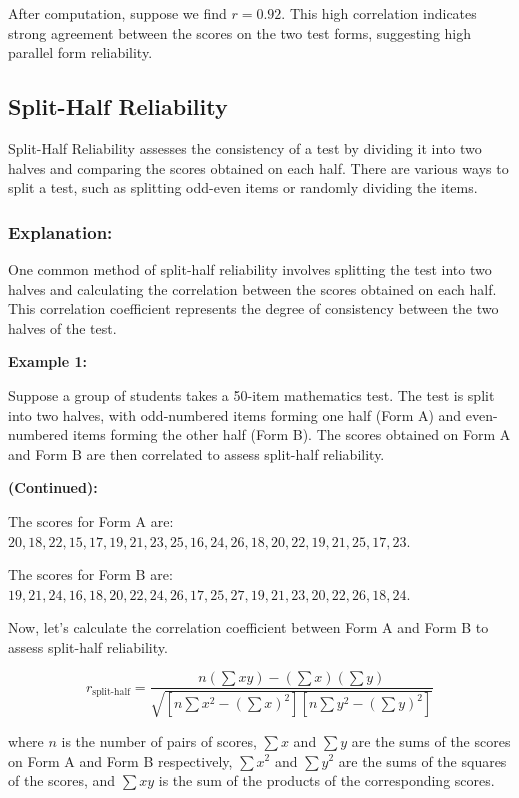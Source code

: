 \documentclass[12pt, a4paper]{exam}
\begin{document}
After computation, suppose we find \(r = 0.92\). This high correlation indicates strong agreement between the scores on the two test forms, suggesting high parallel form reliability.

\subsection{Split-Half Reliability}

Split-Half Reliability assesses the consistency of a test by dividing it into two halves and comparing the scores obtained on each half. There are various ways to split a test, such as splitting odd-even items or randomly dividing the items.

\subsubsection{Explanation:}

One common method of split-half reliability involves splitting the test into two halves and calculating the correlation between the scores obtained on each half. This correlation coefficient represents the degree of consistency between the two halves of the test. 

\textbf{Example 1:}

Suppose a group of students takes a 50-item mathematics test. The test is split into two halves, with odd-numbered items forming one half (Form A) and even-numbered items forming the other half (Form B). The scores obtained on Form A and Form B are then correlated to assess split-half reliability.

\textbf{ (Continued):}

The scores for Form A are: $20, 18, 22, 15, 17, 19, 21, 23, 25, 16, 24, 26, 18, 20, 22, 19, 21, 25, 17, 23$.

The scores for Form B are: $19, 21, 24, 16, 18, 20, 22, 24, 26, 17, 25, 27, 19, 21, 23, 20, 22, 26, 18, 24$.

Now, let's calculate the correlation coefficient between Form A and Form B to assess split-half reliability.

\[
r_{\text{split-half}} = \frac{n(\sum xy) - (\sum x)(\sum y)}{\sqrt{[n\sum x^2 - (\sum x)^2][n\sum y^2 - (\sum y)^2]}}
\]

where $n$ is the number of pairs of scores, $\sum x$ and $\sum y$ are the sums of the scores on Form A and Form B respectively, $\sum x^2$ and $\sum y^2$ are the sums of the squares of the scores, and $\sum xy$ is the sum of the products of the corresponding scores.
\end{document}
